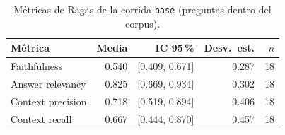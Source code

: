 \begin{table}[ht]
\centering
\begin{tabular}{lrrrr}
\toprule
Métrica & Media & IC 95\,\% & Desv.\ est. & $n$ \\
\midrule
Faithfulness & 0.540 & [0.409, 0.671] & 0.287 & 18 \\
Answer relevancy & 0.825 & [0.669, 0.934] & 0.302 & 18 \\
Context precision & 0.718 & [0.519, 0.894] & 0.406 & 18 \\
Context recall & 0.667 & [0.444, 0.870] & 0.457 & 18 \\
\bottomrule
\end{tabular}
\caption{Métricas de Ragas de la corrida \texttt{base} (preguntas dentro del corpus).}
\label{tab:ragas-base}
\end{table}